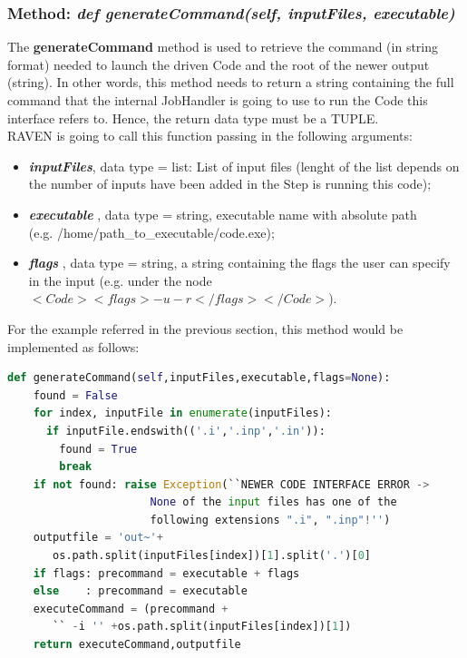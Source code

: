 \subsubsection{Method: \textit{def generateCommand(self, inputFiles, executable)}} 
\label{subsubsec:generateCommand}
The \textbf{generateCommand} method is used to retrieve the command 
(in string format) needed to launch the driven Code and the root of the newer output (string).
 In other words, this 
method needs to return a string containing the full command 
that the internal JobHandler is going to use to run the Code this interface refers to. 
Hence, the return data type must be a TUPLE.
\\RAVEN is going to call this function passing in the following arguments:
\begin{itemize}
  \item \textbf{\textit{inputFiles}}, data type = list: List of input files (lenght of the list depends on the 
           number of inputs  have been added in the Step is running this code);
  \item \textbf{\textit{executable}} , data type = string, executable name with absolute 
            path \\(e.g. /home/path\_to\_executable/code.exe);
  \item  \textbf{\textit{flags}} , data type = string, a string containing the flags the 
               user can specify in the input (e.g. under the node $<Code><flags>-u -r</flags></Code>$).
\end{itemize}
For the example referred in the previous section, this method would be implemented as follows:
\newline
\begin{lstlisting}[language=python]
  def generateCommand(self,inputFiles,executable,flags=None):
    found = False
    for index, inputFile in enumerate(inputFiles):
      if inputFile.endswith(('.i','.inp','.in')):
        found = True
        break
    if not found: raise Exception(``NEWER CODE INTERFACE ERROR ->
                      None of the input files has one of the
                      following extensions ".i", ".inp"!'')
    outputfile = 'out~'+
       os.path.split(inputFiles[index])[1].split('.')[0]
    if flags: precommand = executable + flags
    else    : precommand = executable
    executeCommand = (precommand +
       `` -i '' +os.path.split(inputFiles[index])[1])
    return executeCommand,outputfile
\end{lstlisting} 
